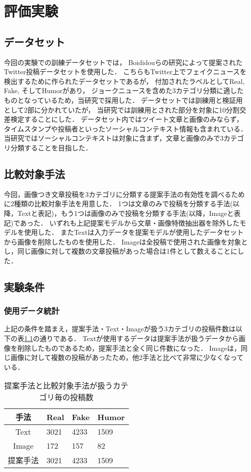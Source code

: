 %
\chapter{評価実験}
%
\section{データセット}
今回の実験での訓練データセットでは，
Boididouらの研究\cite{boididou2015verifying}によって提案されたTwitter投稿データセットを使用した．
こちらもTwitter上でフェイクニュースを検出するために作られたデータセットであるが，
付加されたラベルとしてReal, Fake, そしてHumorがあり，
ジョークニュースを含めた3カテゴリ分類に適したものとなっているため，当研究で採用した．
データセットでは訓練用と検証用として2部に分かれていたが，
当研究では訓練用とされた部分を対象に10分割交差検定することにした．
データセット内ではツイート文章と画像のみならず，
タイムスタンプや投稿者といったソーシャルコンテキスト情報も含まれている．
当研究ではソーシャルコンテキストは対象に含まず，文章と画像のみで3カテゴリ分類することを目指した．
% 
\section{比較対象手法}
今回，画像つき文章投稿を3カテゴリに分類する提案手法の有効性を調べるために2種類の比較対象手法を用意した．
1つは文章のみで投稿を分類する手法(以降，Textと表記)，もう1つは画像のみで投稿を分類する手法(以降，Imageと表記)であった．
いずれも上記提案モデルから文章・画像特徴抽出器を除外したモデルを使用した．
またTextは入力データを提案モデルが使用したデータセットから画像を削除したものを使用した．
Imageは全投稿で使用された画像を対象とし，同じ画像に対して複数の文章投稿があった場合は1件として数えることにした．
% 
\section{実験条件}
\subsection{使用データ統計}
上記の条件を踏まえ，提案手法・Text・Imageが扱う3カテゴリの投稿件数は以下の表\ref{table:posts}の通りである．
Textが使用するデータは提案手法が扱うデータから画像を削除したものであるため，提案手法と全く同じ件数になった．
Imageは，同じ画像に対して複数の投稿があったため，他2手法と比べて非常に少なくなっている．

\begin{table}[h]
    \caption{提案手法と比較対象手法が扱うカテゴリ毎の投稿数}
    \label{table:posts}
    \centering
    \begin{tabular}{clll}
        \hline
        手法 & Real & Fake & Humor \\
        \hline \hline
        Text & 3021 & 4233 & 1509 \\
        Image & 172 & 157 & 82 \\
        提案手法 & 3021 & 4233 & 1509 \\
        \hline
    \end{tabular}
\end{table}

